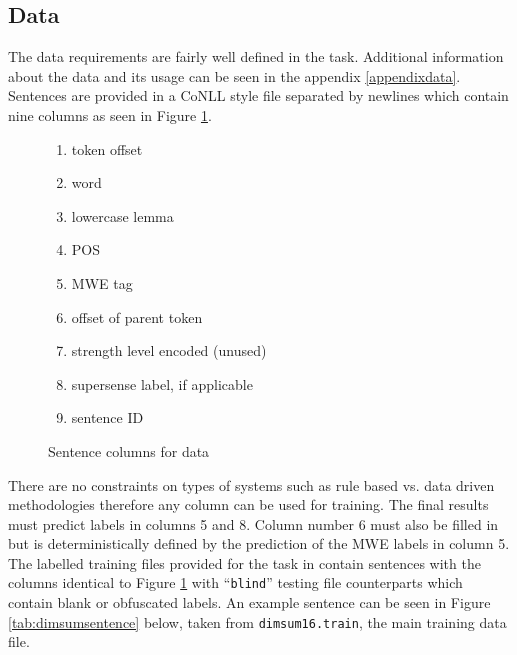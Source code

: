\subsection{Data}
The data requirements are fairly well defined in the \dimsum task. Additional information about the data and its usage can be seen in the appendix \ref{appendixdata}. Sentences are provided in a CoNLL style file separated by newlines which contain nine columns as seen in Figure \ref{fig:dimsumcolumns}.

\begin{figure}[H]
\centering
\begin{framed}
  \centering
  \begin{ttfamily}
    \begin{enumerate}
      \setlength{\itemsep}{0pt}
      \setlength{\parskip}{0pt}
    \item token offset
    \item word
    \item lowercase lemma
    \item POS
    \item MWE tag
    \item offset of parent token
    \item strength level encoded (unused)
    \item supersense label, if applicable
    \item sentence ID
    \end{enumerate}
  \end{ttfamily}
\end{framed}
\caption{Sentence columns for \dimsum data}
\label{fig:dimsumcolumns}
\end{figure}

There are no constraints on types of systems such as rule based vs. data driven methodologies therefore any column can be used for training. The final results must predict labels in columns 5 and 8. Column number 6 must also be filled in but is deterministically defined by the prediction of the MWE labels in column 5. The labelled training files provided for the \dimsum task in \cite{dimsum16webdata} contain sentences with the columns identical to Figure \ref{fig:dimsumcolumns} with ``\texttt{blind}'' testing file counterparts which contain blank or obfuscated labels. An example sentence can be seen in Figure \ref{tab:dimsumsentence} below, taken from \texttt{dimsum16.train}, the main training data file.

